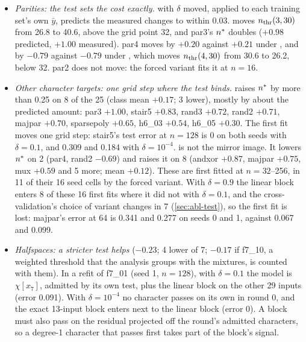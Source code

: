 \begin{itemize}
\item \emph{Parities: the test sets the cost exactly.}  with $\delta$ moved, applied to each training set's own $\bar y$, predicts the measured changes to within 0.03.  moves $n_{\rm thr}(3,30)$ from 26.8 to 40.6, above the grid point 32, and par3's $n^{*}$ doubles ($+0.98$ predicted, $+1.00$ measured). par4 moves by $+0.20$ against $+0.21$ under , and by $-0.79$ against $-0.79$ under , which moves $n_{\rm thr}(4,30)$ from 30.6 to 26.2, below 32. par2 does not move: the forced variant fits it at $n=16$.
\item \emph{Other character targets: one grid step where the test binds.}  raises $n^{*}$ by more than 0.25 on 8 of the 25 (class mean $+0.17$; 3 lower), mostly by about the predicted amount: par3 $+1.00$, stair5 $+0.83$, rand3 $+0.72$, rand2 $+0.71$, majpar $+0.70$, sparsepoly $+0.65$, h6\_03 $+0.54$, h6\_05 $+0.30$. The first fit moves one grid step: stair5's test error at $n=128$ is 0 on both seeds with $\delta=0.1$, and 0.309 and 0.184 with $\delta=10^{-4}$.  is not the mirror image. It lowers $n^{*}$ on 2 (par4, rand2 $-0.69$) and raises it on 8 (andxor $+0.87$, majpar $+0.75$, mux $+0.59$ and 5 more; mean $+0.12$). These are first fitted at $n=32$--256, in 11 of their 16 seed cells by the forced variant. With $\delta=0.9$ the linear block enters 8 of these 16 first fits where it did not with $\delta=0.1$, and the cross-validation's choice of variant changes in 7 (\cref{sec:abl-test}), so the first fit is lost: majpar's error at 64 is 0.341 and 0.277 on seeds 0 and 1, against 0.067 and 0.099.
\item \emph{Halfspaces: a stricter test helps} ($-0.23$; 4 lower of 7; $-0.17$ if f7\_10, a weighted threshold that the analysis groups with the mixtures, is counted with them). In a refit of f7\_01 (seed 1, $n=128$), with $\delta=0.1$ the model is $\chi[x_7]$, admitted by its own test, plus the linear block on the other 29 inputs (error 0.091). With $\delta=10^{-4}$ no character passes on its own in round 0, and the exact 13-input block enters next to the linear block (error 0). A block must also pass on the residual projected off the round's admitted characters, so a degree-1 character that passes first takes part of the block's signal.

\end{itemize}
